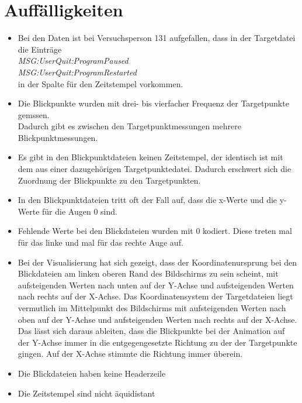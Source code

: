 \chapter{Auff\"alligkeiten}
\begin{itemize}
	\item Bei den Daten ist bei Versuchsperson 131 aufgefallen, dass in der Targetdatei die Eintr\"age\\
		\textit{MSG:UserQuit:ProgramPaused}\\
		\textit{MSG:UserQuit:ProgramRestarted}
		\\ in der Spalte f\"ur den Zeitstempel vorkommen.
	
	\item Die Blickpunkte wurden mit drei- bis vierfacher Frequenz der Targetpunkte gemssen. \\
		Dadurch gibt es zwischen den Targetpunktmessungen mehrere Blickpunktmessungen.
	
	\item Es gibt in den Blickpunktdateien keinen Zeitstempel, der identisch ist mit dem aus einer dazugeh\"origen Targetpunktedatei. Dadurch erschwert sich die Zuordnung der Blickpunkte zu den Targetpunkten.
	
	\item In den Blickpunktdateien tritt oft der Fall auf, dass die x-Werte und die y-Werte f\"ur die Augen 0 sind.
	
	\item Fehlende Werte bei den Blickdateien wurden mit 0 kodiert. Diese treten mal f\"ur das linke und mal f\"ur das rechte Auge auf.
	
	\item Bei der Visualisierung hat sich gezeigt, dass der Koordinatenursprung bei den Blickdateien am linken oberen Rand des Bildschirms zu sein scheint, mit aufsteigenden Werten nach unten auf der Y-Achse und aufsteigenden Werten nach rechts auf der X-Achse. Das Koordinatensystem der Targetdateien liegt vermutlich im Mittelpunkt des Bildschirms mit aufsteigenden Werten nach oben auf der Y-Achse und aufsteigenden Werten nach rechts auf der X-Achse. Das l\"asst sich daraus ableiten, dass die Blickpunkte bei der Animation auf der Y-Achse immer in die entgegengesetzte Richtung zu der der Targetpunkte gingen. Auf der X-Achse stimmte die Richtung immer \"uberein.
	
	\item Die Blickdateien haben keine Headerzeile
	
	\item Die Zeitstempel sind nicht \"aquidistant
	

\end{itemize}
